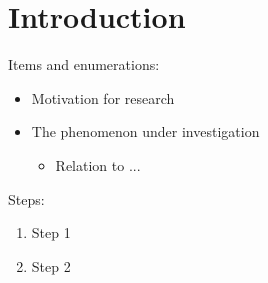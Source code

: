 
\section{Introduction}


\begin{frame}
    Items and enumerations:
    \begin{itemize}
        \item Motivation for research
        \item The phenomenon under investigation
        \begin{itemize}
            \item Relation to ... 
        \end{itemize}
    \end{itemize}
    \vspace{5mm}
    Steps:
    \begin{enumerate}
        \item Step 1
        \item Step 2
    \end{enumerate}
\end{frame}







